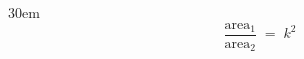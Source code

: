 \documentclass[border=4pt]{standalone}
\begin{document}
\begin{varwidth}{30em}
\large
\[ \frac{\text{area}_1}{\text{area}_2} \;=\; k^2 \]

\end{varwidth}
\end{document}
